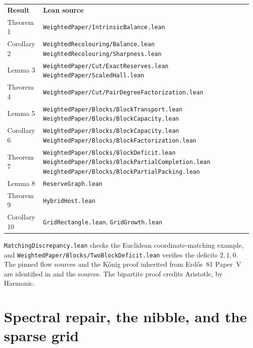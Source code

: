 \documentclass[11pt]{article}
\newcommand{\leanname}[1]{\texttt{\detokenize{#1}}}
\newcommand{\leanref}[1]{\texttt{#1.lean}}
\begin{document}
\smallskip
\begingroup
\renewcommand{\arraystretch}{1.10}
\noindent\begin{tabularx}{\linewidth}{@{}l>{\raggedright\arraybackslash}X@{}}
\textbf{Result} & \textbf{Lean source} \\[2pt]
Theorem 1 & \nolinkurl{WeightedPaper/IntrinsicBalance.lean} \\
Corollary 2 & \nolinkurl{WeightedRecolouring/Balance.lean}\newline
  \nolinkurl{WeightedRecolouring/Sharpness.lean} \\
Lemma 3 & \nolinkurl{WeightedPaper/Cut/ExactReserves.lean}\newline
  \nolinkurl{WeightedPaper/ScaledHall.lean} \\
Theorem 4 & \nolinkurl{WeightedPaper/Cut/PairDegreeFactorization.lean} \\
Lemma 5 & \nolinkurl{WeightedPaper/Blocks/BlockTransport.lean}\newline
  \nolinkurl{WeightedPaper/Blocks/BlockCapacity.lean} \\
Corollary 6 & \nolinkurl{WeightedPaper/Blocks/BlockCapacity.lean}\newline
  \nolinkurl{WeightedPaper/Blocks/BlockFactorization.lean} \\
Theorem 7 & \nolinkurl{WeightedPaper/Blocks/BlockDeficit.lean}\newline
  \nolinkurl{WeightedPaper/Blocks/BlockPartialCompletion.lean}\newline
  \nolinkurl{WeightedPaper/Blocks/BlockPartialPacking.lean} \\
Lemma 8 & \leanref{ReserveGraph} \\
Theorem 9 & \leanref{HybridHost} \\
Corollary 10 & \leanref{GridRectangle}, \leanref{GridGrowth} \\
\end{tabularx}\par
\endgroup

\smallskip
\noindent
\leanref{MatchingDiscrepancy} checks the Euclidean coordinate-matching example, and \nolinkurl{WeightedPaper/Blocks/TwoBlockDeficit.lean} verifies the deficits \(2,1,0\). The pinned flow sources and the K\H{o}nig proof inherited from Erd\H{o}s~81 Paper~V are identified in \leanname{PROVENANCE.md} and the sources. The bipartite proof credits Aristotle, by Harmonic.

\section*{Spectral repair, the nibble, and the sparse grid}
\end{document}
